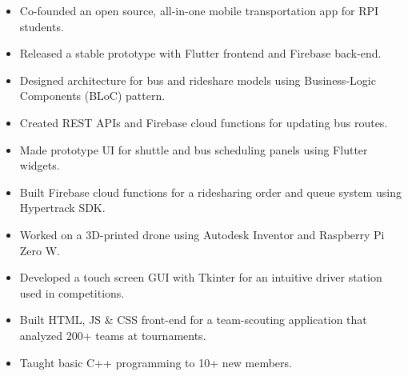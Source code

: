 \documentclass[10pt,a4paper,ragged2e]{altacv}
\begin{document}
\divider

\begin{itemize}
\item Co-founded an open source, all-in-one mobile transportation app for RPI students.
\item Released a stable prototype with Flutter frontend and Firebase back-end.
\item Designed architecture for bus and rideshare models using Business-Logic Components (BLoC) pattern.
\item Created REST APIs and Firebase cloud functions for updating bus routes.
\item Made prototype UI for shuttle and bus scheduling panels using Flutter widgets.
\item Built Firebase cloud functions for a ridesharing order and queue system using Hypertrack SDK.
\end{itemize}

\divider



\begin{itemize}
\item Worked on a 3D-printed drone using Autodesk Inventor and Raspberry Pi Zero W.
\item Developed a touch screen GUI with Tkinter for an intuitive driver station used in competitions.
\item Built  HTML, JS \& CSS front-end for a team-scouting application that analyzed 200+ teams at tournaments.
\item Taught basic C++ programming to 10+ new members.
\end{itemize}


\clearpage


\nocite{*}


\end{document}
